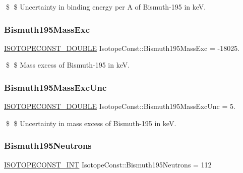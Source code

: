 \$ \$ Uncertainty in binding energy per A of Bismuth-\/195 in keV. \mbox{\label{group___isotope_const-_bismuth-_bi195_ga7805e0fef857c501699e3d756a3de119}} 
\subsubsection{\texorpdfstring{Bismuth195\+Mass\+Exc}{Bismuth195MassExc}}
{\footnotesize\ttfamily \mbox{\hyperlink{group___isotope_const-_macros_ga8f45a7272ce02c0b4c65c44636ed719a}{I\+S\+O\+T\+O\+P\+E\+C\+O\+N\+S\+T\+\_\+\+D\+O\+U\+B\+LE}} Isotope\+Const\+::\+Bismuth195\+Mass\+Exc = -\/18025.}

\$ \$ Mass excess of Bismuth-\/195 in keV. \mbox{\label{group___isotope_const-_bismuth-_bi195_gad5492f95e1b0b15fbcf8f864d708506e}} 
\subsubsection{\texorpdfstring{Bismuth195\+Mass\+Exc\+Unc}{Bismuth195MassExcUnc}}
{\footnotesize\ttfamily \mbox{\hyperlink{group___isotope_const-_macros_ga8f45a7272ce02c0b4c65c44636ed719a}{I\+S\+O\+T\+O\+P\+E\+C\+O\+N\+S\+T\+\_\+\+D\+O\+U\+B\+LE}} Isotope\+Const\+::\+Bismuth195\+Mass\+Exc\+Unc = 5.}

\$ \$ Uncertainty in mass excess of Bismuth-\/195 in keV. \mbox{\label{group___isotope_const-_bismuth-_bi195_ga40f6139d17b961eb337e9b1343bf99a7}} 
\subsubsection{\texorpdfstring{Bismuth195\+Neutrons}{Bismuth195Neutrons}}
{\footnotesize\ttfamily \mbox{\hyperlink{group___isotope_const-_macros_ga5f18360b3e99483a35c32d789e62621c}{I\+S\+O\+T\+O\+P\+E\+C\+O\+N\+S\+T\+\_\+\+I\+NT}} Isotope\+Const\+::\+Bismuth195\+Neutrons = 112}

